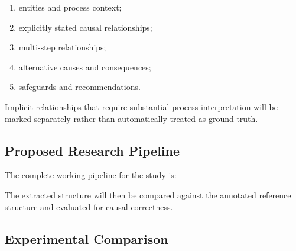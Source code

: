 \begin{enumerate}[label=\textbf{\arabic*.}]
    \item entities and process context;
    \item explicitly stated causal relationships;
    \item multi-step relationships;
    \item alternative causes and consequences;
    \item safeguards and recommendations.
\end{enumerate}

Implicit relationships that require substantial process interpretation
will be marked separately rather than automatically treated as
ground truth.

\subsection{Proposed Research Pipeline}

The complete working pipeline for the study is:

\begin{center}
\end{center}

The extracted structure will then be compared against the annotated
reference structure and evaluated for causal correctness.

\subsection{Experimental Comparison}

